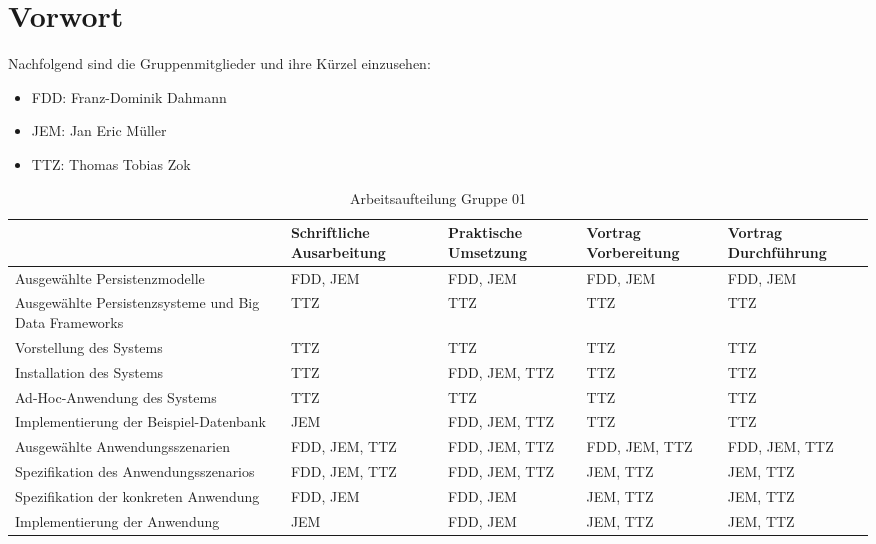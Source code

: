 \chapter{Vorwort}
Nachfolgend sind die Gruppenmitglieder und ihre K\"urzel einzusehen:
\begin{itemize}
\item FDD:    Franz-Dominik Dahmann
\item JEM:    Jan Eric M\"uller
\item TTZ:    Thomas Tobias Zok
\end{itemize}

\begin{table*}[h]
\caption{Arbeitsaufteilung Gruppe 01}
\centering
\begin{tabular}{|p{4cm}|p{2cm}|p{2cm}|p{2cm}|p{2cm}|}
\hline 
	 & Schriftliche Ausarbeitung & Praktische Umsetzung & Vortrag Vorbereitung & Vortrag Durchführung \\ 
\hline 
Ausgewählte Persistenzmodelle & FDD, JEM & FDD, JEM & FDD, JEM & FDD, JEM \\ 
\hline 
Ausgewählte Persistenzsysteme und Big Data Frameworks & TTZ & TTZ & TTZ & TTZ \\ 
\hline 
Vorstellung des Systems & TTZ & TTZ & TTZ & TTZ \\ 
\hline 
Installation des Systems & TTZ & FDD, JEM, TTZ & TTZ & TTZ \\ 
\hline 
Ad-Hoc-Anwendung des Systems & TTZ & TTZ & TTZ & TTZ \\ 
\hline 
Implementierung der Beispiel-Datenbank & JEM & FDD, JEM, TTZ & TTZ & TTZ \\ 
\hline 
Ausgewählte Anwendungsszenarien & FDD, JEM, TTZ & FDD, JEM, TTZ & FDD, JEM, TTZ & FDD, JEM, TTZ \\ 
\hline 
Spezifikation des Anwendungsszenarios & FDD, JEM, TTZ & FDD, JEM, TTZ & JEM, TTZ & JEM, TTZ \\ 
\hline 
Spezifikation der konkreten Anwendung & FDD, JEM & FDD, JEM & JEM, TTZ & JEM, TTZ \\ 
\hline 
Implementierung der Anwendung & JEM & FDD, JEM & JEM, TTZ & JEM, TTZ \\ 
\hline 
\end{tabular} 
\end{table*}